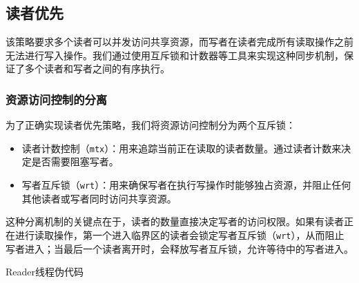 \subsection{读者优先}

该策略要求多个读者可以并发访问共享资源，而写者在读者完成所有读取操作之前无法进行写入操作。我们通过使用互斥锁和计数器等工具来实现这种同步机制，保证了多个读者和写者之间的有序执行。

\subsubsection{资源访问控制的分离}

为了正确实现读者优先策略，我们将资源访问控制分为两个互斥锁：\begin{itemize}
    \item 读者计数控制（\texttt{mtx}）：用来追踪当前正在读取的读者数量。通过读者计数来决定是否需要阻塞写者。
    \item 写者互斥锁（\texttt{wrt}）：用来确保写者在执行写操作时能够独占资源，并阻止任何其他读者或写者同时访问共享资源。
\end{itemize}

这种分离机制的关键点在于，读者的数量直接决定写者的访问权限。如果有读者正在进行读取操作，第一个进入临界区的读者会锁定写者互斥锁（\texttt{wrt}），从而阻止写者进入；当最后一个读者离开时，会释放写者互斥锁，允许等待中的写者进入。

\begin{algorithm}[htbp]
    \caption{Reader线程伪代码}
    \end{algorithm}
    
